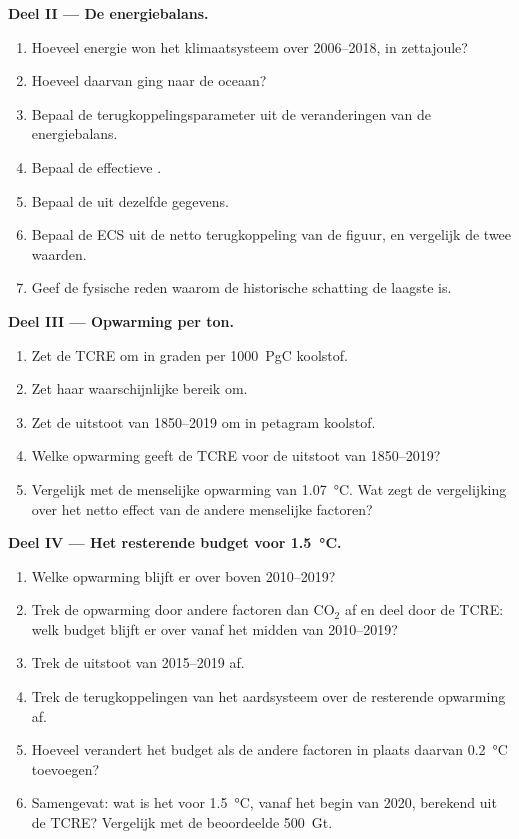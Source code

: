 \begin{problem}
\noindent\textbf{Deel II --- De energiebalans.}
\begin{enumerate}[resume]
  \item Hoeveel energie won het klimaatsysteem over 2006--2018, in zettajoule?
  \item Hoeveel daarvan ging naar de oceaan?
  \item Bepaal de terugkoppelingsparameter uit de veranderingen van de energiebalans.
  \item Bepaal de effectieve .
  \item Bepaal de  uit dezelfde gegevens.
  \item Bepaal de ECS uit de netto terugkoppeling van de figuur, en vergelijk de twee waarden.
  \item Geef de fysische reden waarom de historische schatting de laagste is.
\end{enumerate}

\noindent\textbf{Deel III --- Opwarming per ton.}
\begin{enumerate}[resume]
  \item Zet de TCRE om in graden per \qty{1000}{PgC} koolstof.
  \item Zet haar waarschijnlijke bereik om.
  \item Zet de uitstoot van 1850--2019 om in petagram koolstof.
  \item Welke opwarming geeft de TCRE voor de uitstoot van 1850--2019?
  \item Vergelijk met de menselijke opwarming van \qty{1.07}{\celsius}. Wat zegt de vergelijking over het
        netto effect van de andere menselijke factoren?
\end{enumerate}

\noindent\textbf{Deel IV --- Het resterende budget voor \qty{1.5}{\celsius}.}
\begin{enumerate}[resume]
  \item Welke opwarming blijft er over boven 2010--2019?
  \item Trek de opwarming door andere factoren dan CO$_2$ af en deel door de TCRE: welk budget blijft er over vanaf het midden
        van 2010--2019?
  \item Trek de uitstoot van 2015--2019 af.
  \item Trek de terugkoppelingen van het aardsysteem over de resterende opwarming af.
  \item Hoeveel verandert het budget als de andere factoren in plaats daarvan \qty{0.2}{\celsius} toevoegen?
  \item Samengevat: wat is het  voor \qty{1.5}{\celsius}, vanaf het begin van
        2020, berekend uit de TCRE? Vergelijk met de beoordeelde \qty{500}{Gt}.
\end{enumerate}
\end{problem}
